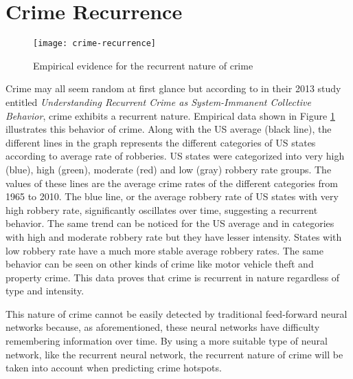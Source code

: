 \section{Crime Recurrence}
    \begin{figure}[H]
        \centering
        \texttt{[image: crime-recurrence]}
        \caption{Empirical evidence for the recurrent nature of crime \citep{perc2013understanding}}
        \label{fig:crime-recurrence}
    \end{figure}
    Crime may all seem random at first glance but according to \cite{perc2013understanding} in their 2013 study entitled \textit{Understanding Recurrent Crime as System-Immanent Collective Behavior}, crime exhibits a recurrent nature. Empirical data shown in Figure \ref{fig:crime-recurrence} illustrates this behavior of crime. Along with the US average (black line), the different lines in the graph represents the different categories of US states according to average rate of robberies. US states were categorized into very high (blue), high (green), moderate (red) and low (gray) robbery rate groups. The values of these lines are the average crime rates of the different categories from 1965 to 2010. The blue line, or the average robbery rate of US states with very high robbery rate, significantly oscillates over time, suggesting a recurrent behavior. The same trend can be noticed for the US average and in categories with high and moderate robbery rate but they have lesser intensity. States with low robbery rate have a much more stable average robbery rates. The same behavior can be seen on other kinds of crime like motor vehicle theft and property crime. This data proves that crime is recurrent in nature regardless of type and intensity.

    This nature of crime cannot be easily detected by traditional feed-forward neural networks because, as aforementioned, these neural networks have difficulty remembering information over time. By using a more suitable type of neural network, like the recurrent neural network, the recurrent nature of crime will be taken into account when predicting crime hotspots.